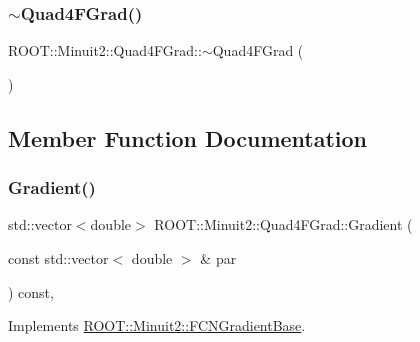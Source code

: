 \mbox{\label{classROOT_1_1Minuit2_1_1Quad4FGrad_a9b87859d52b24a21c72491faba7fb6a5}} 
\subsubsection{\texorpdfstring{$\sim$Quad4FGrad()}{~Quad4FGrad()}\hspace{0.1cm}{\footnotesize\ttfamily [2/2]}}
{\footnotesize\ttfamily R\+O\+O\+T\+::\+Minuit2\+::\+Quad4\+F\+Grad\+::$\sim$\+Quad4\+F\+Grad (\begin{DoxyParamCaption}{ }\end{DoxyParamCaption})\hspace{0.3cm}{\ttfamily [inline]}}



\subsection{Member Function Documentation}
\mbox{\label{classROOT_1_1Minuit2_1_1Quad4FGrad_afd3b64a4236e31bdf9c330e33ac7ac89}} 
\subsubsection{\texorpdfstring{Gradient()}{Gradient()}\hspace{0.1cm}{\footnotesize\ttfamily [1/2]}}
{\footnotesize\ttfamily std\+::vector$<$double$>$ R\+O\+O\+T\+::\+Minuit2\+::\+Quad4\+F\+Grad\+::\+Gradient (\begin{DoxyParamCaption}\item[{const std\+::vector$<$ double $>$ \&}]{par }\end{DoxyParamCaption}) const\hspace{0.3cm}{\ttfamily [inline]}, {\ttfamily [virtual]}}



Implements \mbox{\hyperlink{classROOT_1_1Minuit2_1_1FCNGradientBase_a004740e7e25a1358aafde6694196ef88}{R\+O\+O\+T\+::\+Minuit2\+::\+F\+C\+N\+Gradient\+Base}}.

